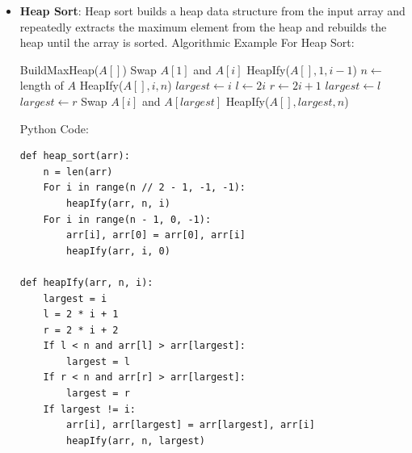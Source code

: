 \documentclass[12pt]{book} %
\begin{document}
\begin{itemize}
\begin{verbatim}
def partition(arr, start, end):
    pivot = arr[end]
    i = start - 1
    For j in range(start, end):
        If arr[j] < pivot:
            i += 1
            arr[i], arr[j] = arr[j], arr[i]
    arr[i + 1], arr[end] = arr[end], arr[i + 1]
    Return i + 1
\end{verbatim}
    \FloatBarrier %
    \item \textbf{Heap Sort}: Heap sort builds a heap data structure from the input array and repeatedly extracts the maximum element from the heap and rebuilds the heap until the array is sorted.
    Algorithmic Example For Heap Sort:
     \FloatBarrier %
     \begin{algorithm}
\caption{Heap Sort}
\begin{algorithmic}[1]
    \State BuildMaxHeap($A[]$)
        \State Swap $A[1]$ and $A[i]$
        \State HeapIfy($A[], 1, i-1$)
    \EndFor
\EndFunction
\FloatBarrier %
    \State $n \gets$ length of $A$
        \State HeapIfy($A[], i, n$)
    \EndFor
\EndFunction
\FloatBarrier %
    \State $largest \gets i$
    \State $l \gets 2i$
    \State $r \gets 2i + 1$
        \State $largest \gets l$
    \EndIf
        \State $largest \gets r$
    \EndIf
        \State Swap $A[i]$ and $A[largest]$
        \State HeapIfy($A[], largest, n$)
    \EndIf
\EndFunction
\end{algorithmic}
\end{algorithm}
\FloatBarrier %
Python Code:
\FloatBarrier %
\begin{verbatim}
def heap_sort(arr):
    n = len(arr)
    For i in range(n // 2 - 1, -1, -1):
        heapIfy(arr, n, i)
    For i in range(n - 1, 0, -1):
        arr[i], arr[0] = arr[0], arr[i]
        heapIfy(arr, i, 0)

def heapIfy(arr, n, i):
    largest = i
    l = 2 * i + 1
    r = 2 * i + 2
    If l < n and arr[l] > arr[largest]:
        largest = l
    If r < n and arr[r] > arr[largest]:
        largest = r
    If largest != i:
        arr[i], arr[largest] = arr[largest], arr[i]
        heapIfy(arr, n, largest)
\end{verbatim}
\end{itemize}
\FloatBarrier %
\end{document}
